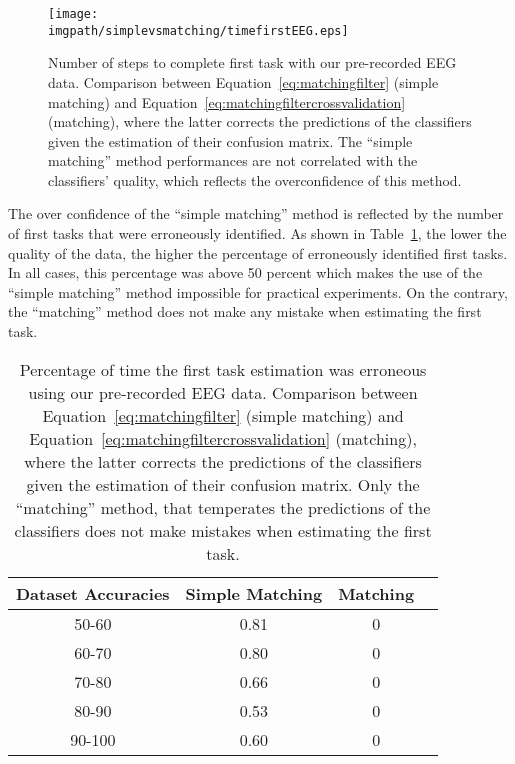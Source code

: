 \begin{figure}[!htbp]
\centering
\texttt{[image: \\imgpath/simplevsmatching/timefirstEEG.eps]}
\caption{Number of steps to complete first task with our pre-recorded EEG data. Comparison between Equation~\ref{eq:matchingfilter} (simple matching) and Equation~\ref{eq:matchingfiltercrossvalidation} (matching), where the latter corrects the predictions of the classifiers given the estimation of their confusion matrix. The ``simple matching'' method performances are not correlated with the classifiers' quality, which reflects the overconfidence of this method.}
\label{fig:timefirst_simplevsmatchingEEG}
\end{figure} 

The over confidence of the ``simple matching'' method is reflected by the number of first tasks that were erroneously identified. As shown in Table~\ref{tab:errorTaskRatiosimplevsmatchingEEG}, the lower the quality of the data, the higher the percentage of erroneously identified first tasks. In all cases, this percentage was above 50 percent which makes the use of the ``simple matching'' method impossible for practical experiments. On the contrary, the ``matching'' method does not make any mistake when estimating the first task.

\begin{table}[!htbp]
\centering
{}
\begin{tabular}{c c c c}
    Dataset Accuracies & Simple Matching &  Matching \\ \hline
    50-60 & 0.81 & 0 \\ 
    60-70 & 0.80 & 0 \\
    70-80 & 0.66 & 0 \\
    80-90 & 0.53 & 0 \\
    90-100 & 0.60 & 0 \\
\end{tabular}
\caption{Percentage of time the first task estimation was erroneous using our pre-recorded EEG data. Comparison between Equation~\ref{eq:matchingfilter} (simple matching) and Equation~\ref{eq:matchingfiltercrossvalidation} (matching), where the latter corrects the predictions of the classifiers given the estimation of their confusion matrix. Only the ``matching'' method, that temperates the predictions of the classifiers does not make mistakes when estimating the first task.}
\label{tab:errorTaskRatiosimplevsmatchingEEG}
\end{table}

